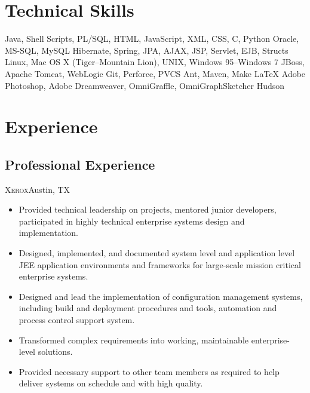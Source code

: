 \documentclass[11pt,letterpaper,sans]{moderncv}
\begin{document}
\section{Technical Skills}
         {Java, Shell Scripts, PL/SQL, HTML, JavaScript, XML, CSS, C, Python}
         {Oracle, MS-SQL, MySQL}
         {Hibernate, Spring, JPA, AJAX, JSP, Servlet, EJB, Structs}
         {Linux, Mac OS X (Tiger--Mountain Lion), UNIX, Windows 95--Windows 7}
         {JBoss, Apache Tomcat, WebLogic}
         {Git, Perforce, PVCS}
         {Ant, Maven, Make}
         {\LaTeX}
         {Adobe Photoshop, Adobe Dreamweaver, OmniGraffle, OmniGraphSketcher}
         {Hudson}



\section{Experience}

  \subsection{Professional Experience}
     {\textsc{Xerox}}{Austin, TX}{}
     {\begin{itemize}
         \item Provided technical leadership on projects, mentored junior 
               developers, participated in highly technical enterprise 
               systems design and implementation.
         \item Designed, implemented, and documented system level and 
               application level JEE application environments and frameworks 
               for large-scale mission critical enterprise systems.
         \item Designed and lead the implementation of configuration 
               management systems, including build and deployment procedures 
               and tools, automation and process control support system.
         \item Transformed complex requirements into working, maintainable 
               enterprise-level solutions.
         \item Provided necessary support to other team members as required 
               to help deliver systems on schedule and with high quality.
     \end{itemize}}
      
\end{document}

